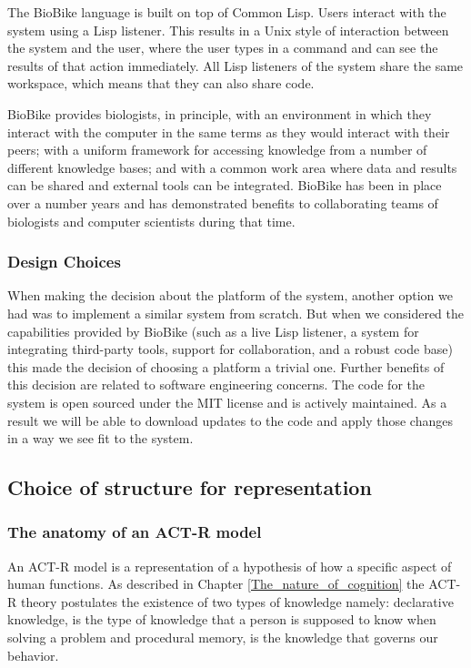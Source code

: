 The BioBike language is built on top of Common Lisp. Users interact
with the system using a Lisp listener. This results in a Unix style of
interaction between the system and the user, where the user types in a
command and can see the results of that action immediately. All Lisp
listeners of the system share the same workspace, which means that
they can also share code.

BioBike provides biologists, in principle, with an environment in
which they interact with the computer in the same terms as they would
interact with their peers; with a uniform framework for accessing
knowledge from a number of different knowledge bases; and with a
common work area where data and results can be shared and external
tools can be integrated.  BioBike has been in place over a number
years and has demonstrated benefits to collaborating teams of
biologists and computer scientists during that time\cite{journals/bioinformatics/MassarTES05}.

\subsubsection{Design Choices}

When making the decision about the platform of the system, another
option we had was to implement a similar system from scratch. But when
we considered the capabilities provided by BioBike (such as a live
Lisp listener, a system for integrating third-party tools, support for
collaboration, and a robust code base) this made the decision of
choosing a platform a trivial one.
%
Further benefits of this decision are related to software engineering
concerns. The code for the system is open sourced under the MIT
license and is actively maintained. As a result we will be able to
download updates to the code and apply those changes in a way we see
fit to the system.

\subsection{Choice of structure for representation}

\subsubsection{The anatomy of an ACT-R model}

An ACT-R model is a representation of a hypothesis of how a specific
aspect of human functions. As described in Chapter
\ref{The_nature_of_cognition} the ACT-R theory postulates the
existence of two types of knowledge namely: declarative
knowledge\cite{actr-tut}, is the type of knowledge that a person is
supposed to know when solving a problem and procedural memory, is the
knowledge that governs our behavior.

